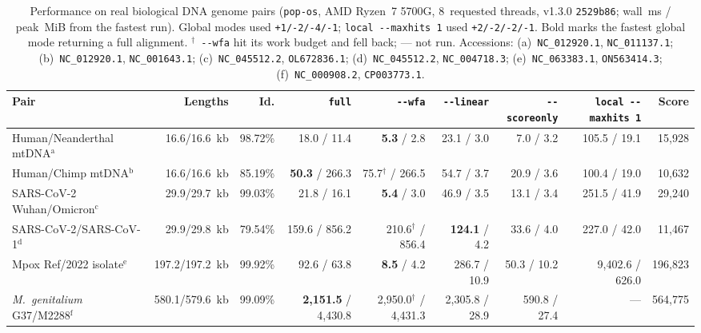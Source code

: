 \documentclass[11pt,a4paper]{article}
\begin{document}
\begin{table}[t]
\centering
\caption{Performance on real biological DNA genome pairs (\texttt{pop-os}, AMD Ryzen~7 5700G, 8~requested threads, v1.3.0 \texttt{2529b86}; wall~ms / peak~MiB from the fastest run). Global modes used \texttt{+1/-2/-4/-1}; \texttt{local -{}-maxhits 1} used \texttt{+2/-2/-2/-1}. Bold marks the fastest global mode returning a full alignment. $^{\dagger}$~\texttt{-{}-wfa} hit its work budget and fell back; --- not run. Accessions: (a)~\texttt{NC\_012920.1}, \texttt{NC\_011137.1}; (b)~\texttt{NC\_012920.1}, \texttt{NC\_001643.1}; (c)~\texttt{NC\_045512.2}, \texttt{OL672836.1}; (d)~\texttt{NC\_045512.2}, \texttt{NC\_004718.3}; (e)~\texttt{NC\_063383.1}, \texttt{ON563414.3}; (f)~\texttt{NC\_000908.2}, \texttt{CP003773.1}.}
\label{tab:real}
\scriptsize
\setlength{\tabcolsep}{2.8pt}
\begin{tabular}{@{}lrrrrrrrr@{}}
\toprule
Pair & Lengths & Id. & \texttt{full} & \texttt{-{}-wfa} & \texttt{-{}-linear} & \texttt{-{}-scoreonly} & \texttt{local -{}-maxhits 1} & Score \\
\midrule
Human/Neanderthal mtDNA$^{\text{a}}$ & 16.6/16.6~kb & 98.72\% & 18.0 / 11.4 & \textbf{5.3} / 2.8 & 23.1 / 3.0 & 7.0 / 3.2 & 105.5 / 19.1 & 15,928 \\
Human/Chimp mtDNA$^{\text{b}}$ & 16.6/16.6~kb & 85.19\% & \textbf{50.3} / 266.3 & 75.7$^{\dagger}$ / 266.5 & 54.7 / 3.7 & 20.9 / 3.6 & 100.4 / 19.0 & 10,632 \\
SARS-CoV-2 Wuhan/Omicron$^{\text{c}}$ & 29.9/29.7~kb & 99.03\% & 21.8 / 16.1 & \textbf{5.4} / 3.0 & 46.9 / 3.5 & 13.1 / 3.4 & 251.5 / 41.9 & 29,240 \\
SARS-CoV-2/SARS-CoV-1$^{\text{d}}$ & 29.9/29.8~kb & 79.54\% & 159.6 / 856.2 & 210.6$^{\dagger}$ / 856.4 & \textbf{124.1} / 4.2 & 33.6 / 4.0 & 227.0 / 42.0 & 11,467 \\
Mpox Ref/2022 isolate$^{\text{e}}$ & 197.2/197.2~kb & 99.92\% & 92.6 / 63.8 & \textbf{8.5} / 4.2 & 286.7 / 10.9 & 50.3 / 10.2 & 9,402.6 / 626.0 & 196,823 \\
\textit{M.~genitalium} G37/M2288$^{\text{f}}$ & 580.1/579.6~kb & 99.09\% & \textbf{2,151.5} / 4,430.8 & 2,950.0$^{\dagger}$ / 4,431.3 & 2,305.8 / 28.9 & 590.8 / 27.4 & --- & 564,775 \\
\bottomrule
\end{tabular}
\end{table}
\end{document}
